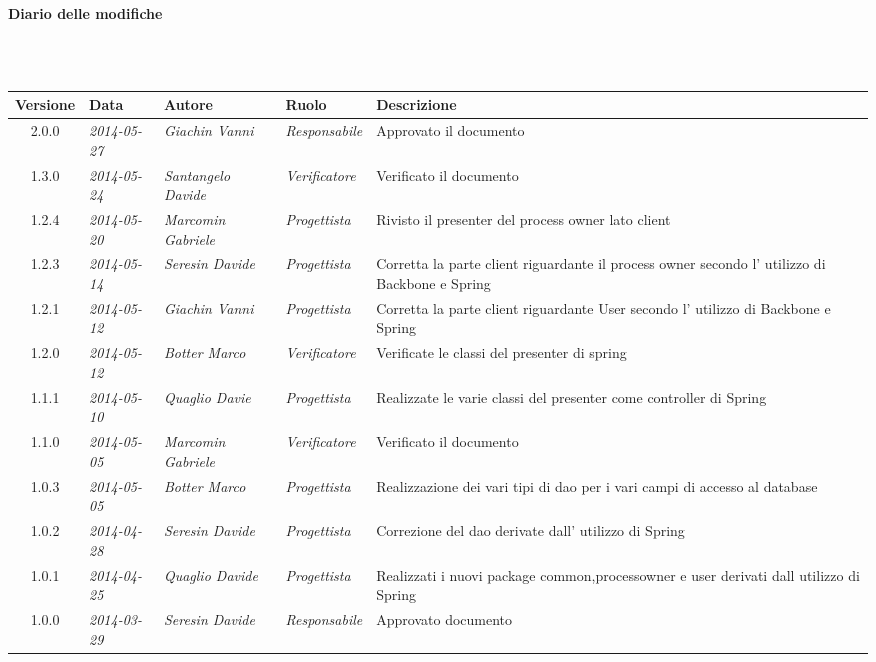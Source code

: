 \noindent\begin{Large}\textbf{Diario delle modifiche}\end{Large}\\
\\
\begin{small}
\begin{tabular}{|c|p{1.8cm}|p{2.8cm}|p{2.8cm}|p{3.5cm}|}
\hline
Versione & Data & Autore & Ruolo & Descrizione \\
\hline
\hline
2.0.0 & \textit{2014-05-27} & 
\textit{Giachin Vanni} &
\textit{Responsabile} & Approvato il documento\\
\hline
1.3.0 & \textit{2014-05-24} & 
\textit{Santangelo Davide} &
\textit{Verificatore} & Verificato il documento\\
\hline
1.2.4 & \textit{2014-05-20} & 
\textit{Marcomin Gabriele} &
\textit{Progettista} & Rivisto il presenter del process owner lato client\\
\hline
1.2.3 & \textit{2014-05-14} & 
\textit{Seresin Davide} &
\textit{Progettista} & Corretta la parte client riguardante il process owner secondo l' utilizzo di Backbone e Spring\\
\hline
1.2.1 & \textit{2014-05-12} & 
\textit{Giachin Vanni} &
\textit{Progettista} & Corretta la parte client riguardante User secondo l' utilizzo di Backbone e Spring\\
\hline
1.2.0 & \textit{2014-05-12} & 
\textit{Botter Marco} &
\textit{Verificatore} & Verificate le classi del presenter di spring\\
\hline
1.1.1 & \textit{2014-05-10} & 
\textit{Quaglio Davie} &
\textit{Progettista} & Realizzate le varie classi del presenter come controller di Spring\\
\hline
1.1.0 & \textit{2014-05-05} & 
\textit{Marcomin Gabriele} &
\textit{Verificatore} & Verificato il documento\\
\hline
1.0.3 & \textit{2014-05-05} & 
\textit{Botter Marco} &
\textit{Progettista} & Realizzazione dei vari tipi di dao per i vari campi di accesso al database\\
\hline
1.0.2 & \textit{2014-04-28} & 
\textit{Seresin Davide} &
\textit{Progettista} & Correzione del dao derivate dall' utilizzo di Spring\\
\hline
1.0.1 & \textit{2014-04-25} & 
\textit{Quaglio Davide} &
\textit{Progettista} &Realizzati i nuovi package common,processowner e user derivati dall utilizzo di Spring\\
\hline
1.0.0 & \textit{2014-03-29} & 
\textit{Seresin Davide} &
\textit{Responsabile} &Approvato documento\\
\hline
\end{tabular}


\end{small}
